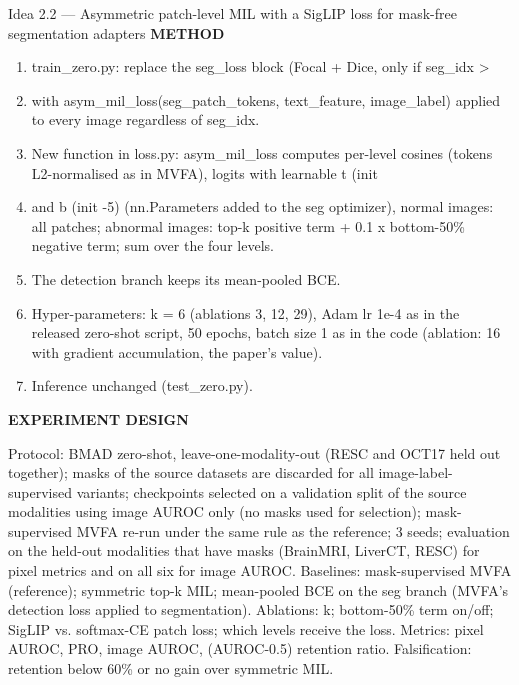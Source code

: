 \documentclass[11pt,a4paper]{article}
\newcommand{\lbl}[1]{{\sffamily\footnotesize\bfseries\color{muted}\MakeUppercase{#1}}\par}
\begin{document}
\begin{ideabox}{Idea 2.2 — Asymmetric patch-level MIL with a SigLIP loss for mask-free segmentation adapters}
\lbl{Method}\begin{enumerate}[leftmargin=1.6em,itemsep=1pt,topsep=2pt]
\item train\_\allowbreak{}zero.py: replace the seg\_\allowbreak{}loss block (Focal + Dice, only if seg\_\allowbreak{}idx \textgreater{}
\item with asym\_\allowbreak{}mil\_\allowbreak{}loss(seg\_\allowbreak{}patch\_\allowbreak{}tokens, text\_\allowbreak{}feature, image\_\allowbreak{}label) applied to every image regardless of seg\_\allowbreak{}idx.
\item New function in loss.py: asym\_\allowbreak{}mil\_\allowbreak{}loss computes per-level cosines (tokens L2-normalised as in MVFA), logits with learnable t (init
\item and b (init -5) (nn.Parameters added to the seg optimizer), normal images: all patches; abnormal images: top-k positive term + 0.1 x bottom-50\% negative term; sum over the four levels.
\item The detection branch keeps its mean-pooled BCE.
\item Hyper-parameters: k = 6 (ablations 3, 12, 29), Adam lr 1e-4 as in the released zero-shot script, 50 epochs, batch size 1 as in the code (ablation: 16 with gradient accumulation, the paper's value).
\item Inference unchanged (test\_\allowbreak{}zero.py).
\end{enumerate}

\lbl{Experiment design}Protocol: BMAD zero-shot, leave-one-modality-out (RESC and OCT17 held out together); masks of the source datasets are discarded for all image-label-supervised variants; checkpoints selected on a validation split of the source modalities using image AUROC only (no masks used for selection); mask-supervised MVFA re-run under the same rule as the reference; 3 seeds; evaluation on the held-out modalities that have masks (BrainMRI, LiverCT, RESC) for pixel metrics and on all six for image AUROC. Baselines: mask-supervised MVFA (reference); symmetric top-k MIL; mean-pooled BCE on the seg branch (MVFA's detection loss applied to segmentation). Ablations: k; bottom-50\% term on/off; SigLIP vs. softmax-CE patch loss; which levels receive the loss. Metrics: pixel AUROC, PRO, image AUROC, (AUROC-0.5) retention ratio. Falsification: retention below 60\% or no gain over symmetric MIL.


\end{ideabox}
\end{document}
